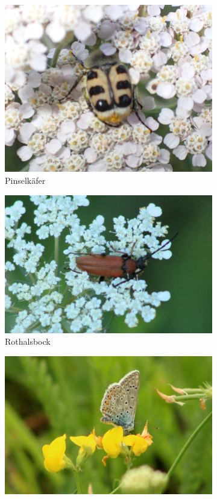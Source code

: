 \documentclass[11pt]{article}
\begin{document}
\begin{figure}[h!]
  \centering
  \begin{subfigure}[b]{0.4\linewidth}
    \includegraphics[width=\linewidth]{img/pinselkaefer.jpg}
    \caption{Pinselkäfer}
  \end{subfigure}
  \begin{subfigure}[b]{0.48\linewidth}
    \includegraphics[width=\linewidth]{img/schmalbock.jpg}
    \caption{Rothalsbock}
  \end{subfigure}
  \begin{subfigure}[b]{0.48\linewidth}
    \includegraphics[width=\linewidth]{img/blaeuling.jpg}

\end{subfigure}
\end{figure}
\end{document}
